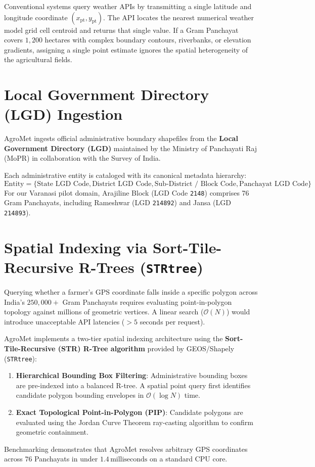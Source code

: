 \documentclass[11pt,a4paper,oneside]{report}
\begin{document}
Conventional systems query weather APIs by transmitting a single latitude and longitude coordinate $(x_{\text{pt}}, y_{\text{pt}})$. The API locates the nearest numerical weather model grid cell centroid and returns that single value. If a Gram Panchayat covers $1,200$ hectares with complex boundary contours, riverbanks, or elevation gradients, assigning a single point estimate ignores the spatial heterogeneity of the agricultural fields.

\section{Local Government Directory (LGD) Ingestion}
AgroMet ingests official administrative boundary shapefiles from the \textbf{Local Government Directory (LGD)} maintained by the Ministry of Panchayati Raj (MoPR) in collaboration with the Survey of India. 

Each administrative entity is cataloged with its canonical metadata hierarchy:
\begin{equation}
\text{Entity} = \{\text{State LGD Code}, \text{District LGD Code}, \text{Sub-District / Block Code}, \text{Panchayat LGD Code}\}
\end{equation}
For our Varanasi pilot domain, Arajiline Block (LGD Code \texttt{2148}) comprises 76 Gram Panchayats, including Rameshwar (LGD \texttt{214892}) and Jansa (LGD \texttt{214893}).

\section{Spatial Indexing via Sort-Tile-Recursive R-Trees (\texttt{STRtree})}
Querying whether a farmer's GPS coordinate falls inside a specific polygon across India's $250,000+$ Gram Panchayats requires evaluating point-in-polygon topology against millions of geometric vertices. A linear search ($\mathcal{O}(N)$) would introduce unacceptable API latencies ($>5$ seconds per request).

AgroMet implements a two-tier spatial indexing architecture using the \textbf{Sort-Tile-Recursive (STR) R-Tree algorithm} provided by GEOS/Shapely (\texttt{STRtree}):
\begin{enumerate}[leftmargin=*]
    \item \textbf{Hierarchical Bounding Box Filtering}: Administrative bounding boxes are pre-indexed into a balanced R-tree. A spatial point query first identifies candidate polygon bounding envelopes in $\mathcal{O}(\log N)$ time.
    \item \textbf{Exact Topological Point-in-Polygon (PIP)}: Candidate polygons are evaluated using the Jordan Curve Theorem ray-casting algorithm to confirm geometric containment.
\end{enumerate}
Benchmarking demonstrates that AgroMet resolves arbitrary GPS coordinates across $76$ Panchayats in under $1.4\,\text{milliseconds}$ on a standard CPU core.
\end{document}
